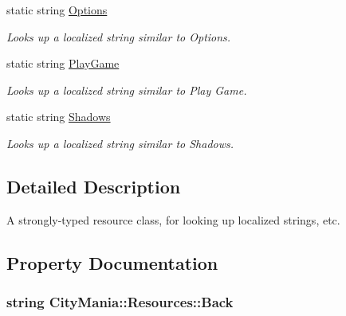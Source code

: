 \begin{DoxyCompactItemize}
static string \hyperlink{classCityMania_1_1Resources_af64db8863ac6a534dab4955d41174608}{Options}
\begin{DoxyCompactList}\small\item\em Looks up a localized string similar to Options. \item\end{DoxyCompactList}\item 
static string \hyperlink{classCityMania_1_1Resources_a8dff89b9eefe51a5fe443afc53bcaea7}{PlayGame}
\begin{DoxyCompactList}\small\item\em Looks up a localized string similar to Play Game. \item\end{DoxyCompactList}\item 
static string \hyperlink{classCityMania_1_1Resources_af42bfbda6e4ab38576291744fbe8ec71}{Shadows}
\begin{DoxyCompactList}\small\item\em Looks up a localized string similar to Shadows. \item\end{DoxyCompactList}\end{DoxyCompactItemize}


\subsection{Detailed Description}
A strongly-\/typed resource class, for looking up localized strings, etc. 

\subsection{Property Documentation}
\hypertarget{classCityMania_1_1Resources_a8d5378dee3e6fa58682fe86eabb41835}{
\subsubsection[{Back}]{\setlength{\rightskip}{0pt plus 5cm}string CityMania::Resources::Back}}
\label{classCityMania_1_1Resources_a8d5378dee3e6fa58682fe86eabb41835}


